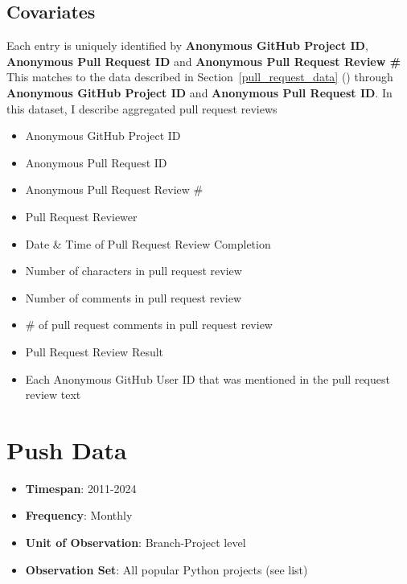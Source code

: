 \documentclass[12pt,notitlepage]{article}
\begin{document}
\subsection*{Covariates}
Each entry is uniquely identified by \textbf{Anonymous GitHub Project ID}, \textbf{Anonymous Pull Request ID} and \textbf{Anonymous Pull Request Review \#} 
This matches to the data described in Section~\ref{pull_request_data} () through \textbf{Anonymous GitHub Project ID} and \textbf{Anonymous Pull Request ID}. In this dataset, I describe aggregated pull request reviews
\begin{itemize}
    \item Anonymous GitHub Project ID
    \item Anonymous Pull Request ID
    \item Anonymous Pull Request Review \# 
    \item Pull Request Reviewer
    \item Date \& Time of Pull Request Review Completion
    \item Number of characters in pull request review
    \item Number of comments in pull request review
    \item \# of pull request comments in pull request review
    \item Pull Request Review Result
    \item Each Anonymous GitHub User ID that was mentioned in the pull request review text 
\end{itemize}

\section{Push Data}
\begin{itemize}
    \item \textbf{Timespan}: 2011-2024
    \item \textbf{Frequency}: Monthly
    \item \textbf{Unit of Observation}: Branch-Project level
    \item \textbf{Observation Set}: All popular Python projects (see list)
\end{itemize}
\end{document}

